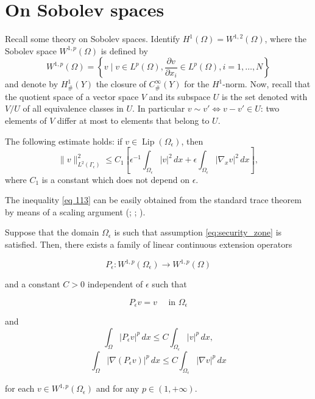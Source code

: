 \section{On Sobolev spaces}
Recall some theory on Sobolev spaces.
Identify $H^{1}(\Omega)=W^{1,2}(\Omega)$, where the Sobolev space $W^{1, p}(\Omega)$ is defined by
$$
W^{1, p}(\Omega)=\left\{v \mid v \in L^{p}(\Omega), \frac{\partial v}{\partial x_{i}} \in L^{p}(\Omega), i=1, \ldots, N\right\}
$$
and denote by $H_{\#}^{1}(Y)$ the closure of $C_{\#}^{\infty}(Y)$ for the $H^{1}$-norm.
Now, recall that the quotient space of a vector space $V$ and its subspace $U$ is the set denoted with $V/U$ of all equivalence classes in $U$. In particular $v \sim v' \iff v-v'\in U$: two elements of $V$ differ at most to elements that belong to $U$.

\begin{lemma} The following estimate holds: if $v \in \operatorname{Lip}\left(\Omega_{\epsilon}\right)$, then
\begin{equation}
  \|v\|_{L^{2}\left(\Gamma_{\epsilon}\right)}^{2} \leq C_{1}\left[\epsilon^{-1} \int_{\Omega_{\epsilon}}|v|^{2} \, d  x+\epsilon \int_{\Omega_{\epsilon}}\left|\nabla_{x} v\right|^{2} \, d  x\right],
\label{eq 113}\end{equation}
where $C_{1}$ is a constant which does not depend on $\epsilon$.
\label{lemma 7.1}\end{lemma}
The inequality \eqref{eq 113} can be easily obtained from the standard trace theorem by means of a scaling argument (\cite{Allaire_et_al}; \cite{Piat_Piatnitski_2010}; \cite{Piat_Nazarov_Piatnitski_2012}).
\begin{lemma}
  
 Suppose that the domain $\Omega_{\epsilon}$ is such that assumption \eqref{eq:security_zone} is satisfied. Then, there exists a family of linear continuous extension operators

$$
P_{\epsilon}: W^{1, p}\left(\Omega_{\epsilon}\right) \rightarrow W^{1, p}(\Omega)
$$

and a constant $C>0$ independent of $\epsilon$ such that

$$
P_{\epsilon} v=v \quad \text { in } \Omega_{\epsilon}
$$

and
\begin{equation}
  \int_{\Omega}\left|P_{\epsilon} v\right|^{p} \, d  x \leq C \int_{\Omega_{\epsilon}}|v|^{p} \, d  x,
\label{eq 114}\end{equation}
\begin{equation}
  \int_{\Omega}\left|\nabla\left(P_{\epsilon} v\right)\right|^{p} \, d  x \leq C \int_{\Omega_{\epsilon}}|\nabla v|^{p} \, d  x
\label{eq 115}\end{equation}

for each $v \in W^{1, p}\left(\Omega_{\epsilon}\right)$ and for any $p \in(1,+\infty)$.
\label{lemma 7.2}\end{lemma}


